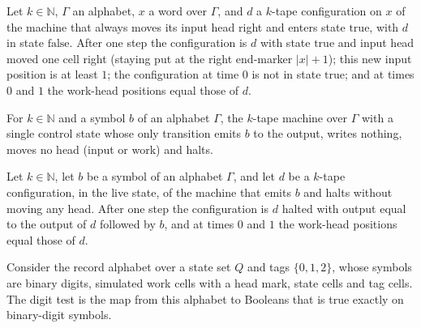 \begin{lemma}
\label{Complexity.sph_right_run}
\leanok
{}
Let $k\in\mathbb{N}$, $\Gamma$ an alphabet, $x$ a word over $\Gamma$, and $d$ a $k$-tape configuration
on $x$ of the machine that always moves its input head right and enters state $\mathrm{true}$,
with $d$ in state $\mathrm{false}$. After one step the configuration is $d$ with state
$\mathrm{true}$ and input head moved one cell right (staying put at the right end-marker
$|x|+1$); this new input position is at least $1$; the configuration at time $0$ is not in state
$\mathrm{true}$; and at times $0$ and $1$ the work-head positions equal those of $d$.
\end{lemma}

\begin{definition}
\label{Complexity.sphEmitTM}
\leanok
{}
For $k\in\mathbb{N}$ and a symbol $b$ of an alphabet $\Gamma$, the $k$-tape machine over $\Gamma$
with a single control state whose only transition emits $b$ to the output, writes nothing, moves no
head (input or work) and halts.
\end{definition}

\begin{lemma}
\label{Complexity.sph_emit_run}
\leanok
{}
Let $k\in\mathbb{N}$, let $b$ be a symbol of an alphabet $\Gamma$, and let $d$ be a $k$-tape
configuration, in the live state, of the machine that emits $b$ and halts without moving any head.
After one step the configuration is $d$ halted with output equal to the output of $d$ followed by
$b$, and at times $0$ and $1$ the work-head positions equal those of $d$.
\end{lemma}

\begin{definition}
\label{Complexity.sphDigit}
\leanok
{}
Consider the record alphabet over a state set $Q$ and tags $\{0,1,2\}$, whose symbols are binary
digits, simulated work cells with a head mark, state cells and tag cells. The digit test is the map
from this alphabet to Booleans that is true exactly on binary-digit symbols.
\end{definition}

